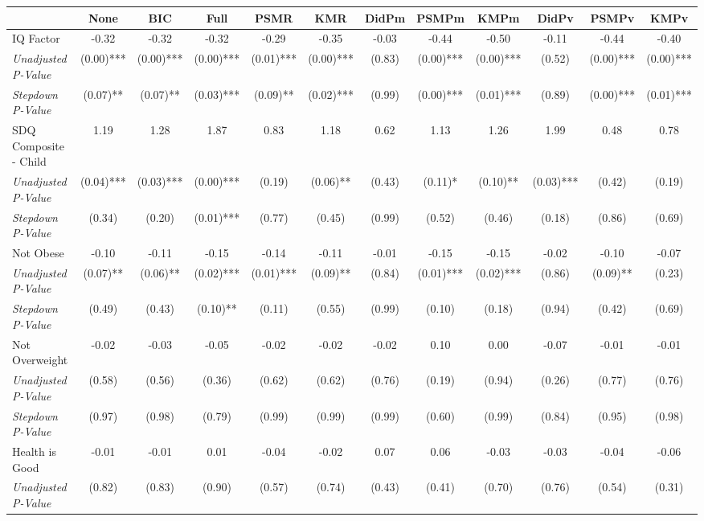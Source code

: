 \begin{tabular}{l c c c c c c c c c c c}
\toprule
 & None & BIC & Full & PSMR & KMR & DidPm & PSMPm & KMPm & DidPv & PSMPv & KMPv \\
\midrule
IQ Factor & -0.32 & -0.32 & -0.32 & -0.29 & -0.35 & -0.03 & -0.44 & -0.50 & -0.11 & -0.44 & -0.40 \\
\quad \textit{Unadjusted P-Value} & (0.00)*** & (0.00)*** & (0.00)*** & (0.01)*** & (0.00)*** & (0.83) & (0.00)*** & (0.00)*** & (0.52) & (0.00)*** & (0.00)*** \\
\quad \textit{Stepdown P-Value} & (0.07)** & (0.07)** & (0.03)*** & (0.09)** & (0.02)*** & (0.99) & (0.00)*** & (0.01)*** & (0.89) & (0.00)*** & (0.01)*** \\
SDQ Composite - Child & 1.19 & 1.28 & 1.87 & 0.83 & 1.18 & 0.62 & 1.13 & 1.26 & 1.99 & 0.48 & 0.78 \\
\quad \textit{Unadjusted P-Value} & (0.04)*** & (0.03)*** & (0.00)*** & (0.19) & (0.06)** & (0.43) & (0.11)* & (0.10)** & (0.03)*** & (0.42) & (0.19) \\
\quad \textit{Stepdown P-Value} & (0.34) & (0.20) & (0.01)*** & (0.77) & (0.45) & (0.99) & (0.52) & (0.46) & (0.18) & (0.86) & (0.69) \\
Not Obese & -0.10 & -0.11 & -0.15 & -0.14 & -0.11 & -0.01 & -0.15 & -0.15 & -0.02 & -0.10 & -0.07 \\
\quad \textit{Unadjusted P-Value} & (0.07)** & (0.06)** & (0.02)*** & (0.01)*** & (0.09)** & (0.84) & (0.01)*** & (0.02)*** & (0.86) & (0.09)** & (0.23) \\
\quad \textit{Stepdown P-Value} & (0.49) & (0.43) & (0.10)** & (0.11) & (0.55) & (0.99) & (0.10) & (0.18) & (0.94) & (0.42) & (0.69) \\
Not Overweight & -0.02 & -0.03 & -0.05 & -0.02 & -0.02 & -0.02 & 0.10 & 0.00 & -0.07 & -0.01 & -0.01 \\
\quad \textit{Unadjusted P-Value} & (0.58) & (0.56) & (0.36) & (0.62) & (0.62) & (0.76) & (0.19) & (0.94) & (0.26) & (0.77) & (0.76) \\
\quad \textit{Stepdown P-Value} & (0.97) & (0.98) & (0.79) & (0.99) & (0.99) & (0.99) & (0.60) & (0.99) & (0.84) & (0.95) & (0.98) \\
Health is Good & -0.01 & -0.01 & 0.01 & -0.04 & -0.02 & 0.07 & 0.06 & -0.03 & -0.03 & -0.04 & -0.06 \\
\quad \textit{Unadjusted P-Value} & (0.82) & (0.83) & (0.90) & (0.57) & (0.74) & (0.43) & (0.41) & (0.70) & (0.76) & (0.54) & (0.31) \\

\end{tabular}
